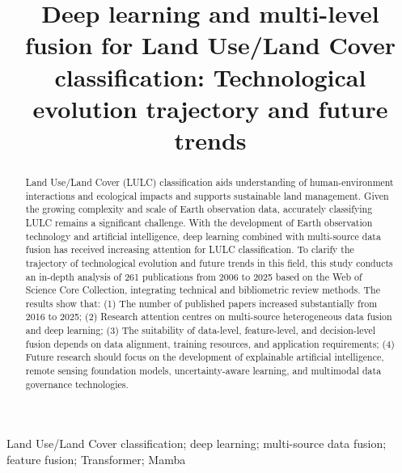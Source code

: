 \documentclass[]{interact}
\theoremstyle{plain}%
\theoremstyle{definition}
\theoremstyle{remark}
\begin{document}

\title{Deep learning and multi-level fusion for Land Use/Land Cover classification: Technological evolution trajectory and future trends}

\author{
}

\maketitle

\begin{abstract}
Land Use/Land Cover (LULC) classification aids understanding of human-environment interactions and ecological impacts and supports sustainable land management. Given the growing complexity and scale of Earth observation data, accurately classifying LULC remains a significant challenge. With the development of Earth observation technology and artificial intelligence, deep learning combined with multi-source data fusion has received increasing attention for LULC classification. To clarify the trajectory of technological evolution and future trends in this field, this study conducts an in-depth analysis of 261 publications from 2006 to 2025 based on the Web of Science Core Collection, integrating technical and bibliometric review methods. The results show that: (1) The number of published papers increased substantially from 2016 to 2025; (2) Research attention centres on multi-source heterogeneous data fusion and deep learning; (3) The suitability of data-level, feature-level, and decision-level fusion depends on data alignment, training resources, and application requirements; (4) Future research should focus on the development of explainable artificial intelligence, remote sensing foundation models, uncertainty-aware learning, and multimodal data governance technologies.
\end{abstract}

\begin{keywords}
Land Use/Land Cover classification; deep learning; multi-source data fusion; feature fusion; Transformer; Mamba
\end{keywords}
\end{document}

